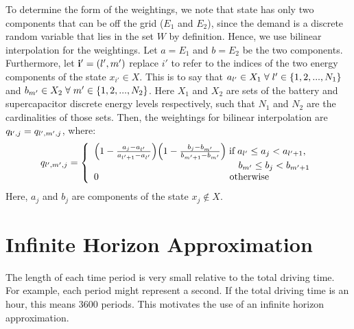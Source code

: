 \documentclass[conference]{IEEEtran}
\begin{document}
To determine the form of the weightings, we note that  state has only two components that can be off the grid ($E_{1}$ and $E_{2}$), since the demand is a discrete random variable that lies in the set $W$ by definition. Hence, we use bilinear interpolation for the weightings. Let $a=E_{1}$ and $b=E_{2}$ be the two components. Furthermore, let $\bold{i'}=(l',m')$ replace $i'$ to refer to the indices of the two energy components of the state $x_{i'}\in X$. This is to say that $a_{l'}\in X_{1}\hspace{0.1cm}\forall\hspace{0.1cm}l'\in\{1,2,..., N_{1}\}$ and $b_{m'}\in X_{2}\hspace{0.1cm}\forall\hspace{0.1cm} m'\in\{1,2,..., N_{2}\}$. Here $X_{1}$ and $X_{2}$ are sets of the battery and supercapacitor discrete energy levels respectively, such that $N_{1}$ and $N_{2}$ are the cardinalities of those sets. Then, the weightings for bilinear interpolation are $q_{\bold{i'},j}=q_{l',m',j}$, where:
\begin{displaymath}q_{l',m',j}=
\left\{
\begin{array}{l}
\Big(1-\frac{a_{j}-a_{l'}}{a_{l'+1}-a_{l'}}\Big)\Big(1-\frac{b_{j}-b_{m'}}{b_{m'+1}-b_{m'}}\Big)\hspace{0.1cm} \text{if} \hspace{0.1cm} a_{l'}\leq a_{j}< a_{l'+1},\\ \hspace{5.3cm}b_{m'}\leq b_{j}< b_{m'+1}\\
0		   \hspace{4.8cm} \text{otherwise}
\end{array}
\right.
\end{displaymath} Here, $a_{j}$ and $b_{j}$ are components of the state $x_{j}\not\in X$.


\section{Infinite Horizon Approximation}
The length of each time period is very small relative to the total driving time. For example, each period might represent a second. If the total driving time is an hour, this means 3600 periods. This motivates the use of an infinite horizon approximation.
\end{document}
